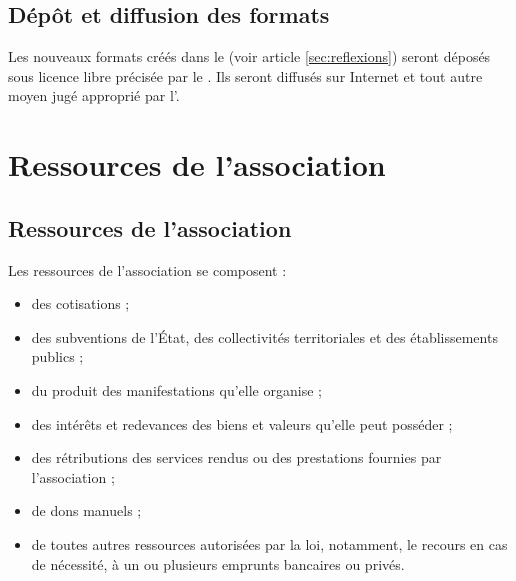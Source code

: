 \documentclass[a4paper,french,10pt]{article}
\newcommand{\article}[1]{\subsection{#1}\addtocounter{article}{1}}
\newcounter{article}
\newcommand{\artref}[1]{article \ref{#1}}
\begin{document}
\article{Dépôt et diffusion des formats}
\label{sec:depot-et-diffusion}
Les nouveaux formats créés dans le \PA{} (voir \artref{sec:reflexions}) seront déposés sous licence libre précisée par le \RI{}. Ils seront diffusés sur Internet et tout autre moyen jugé approprié par l'\AG{}.






\section{Ressources de l’association}

\article{Ressources de l’association}
\label{sec:ressources}
Les ressources de l’association se composent :
\begin{itemize}
\item des cotisations ;
  
\item des subventions de l’État, des collectivités territoriales et
des établissements publics ;

\item du produit des manifestations qu’elle organise ;

\item des intérêts et redevances des biens et valeurs qu’elle peut
posséder ;

\item des rétributions des services rendus ou des prestations fournies
par l'association ;

\item de dons manuels ;

\item de toutes autres ressources autorisées par la loi, notamment, le
recours en cas de nécessité, à un ou plusieurs emprunts bancaires ou
privés.
\end{itemize}
\end{document}
